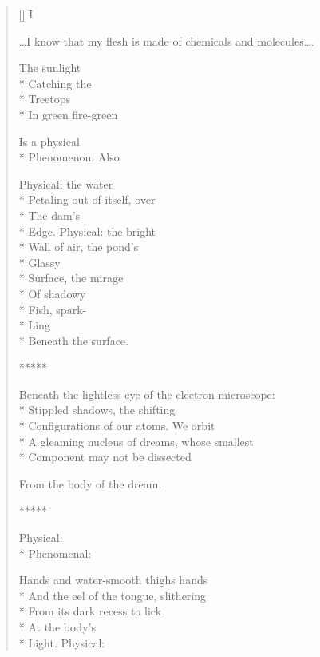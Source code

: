 \label{ch:the_body_of_the_dream}
\settowidth{\versewidth}{     \ldots . I know that my flesh is made of chemicals and molecules. I know that what I'm seeing is like a dream. I know that consciousness is something totally different but yet in some powerful way connected to this physical/chemical organization\ldots .}
\begin{verse}[\versewidth]
                                        I

     \ldots I know that my flesh is made of chemicals and molecules\ldots .

The sunlight\\*
Catching the\\*
Treetops\\*
In green fire-green

Is a physical\\*
Phenomenon.     Also

Physical:     the water\\*
Petaling out of itself, over\\*
The dam's\\*
Edge.      Physical:      the bright\\*
Wall of air, the pond's\\*
Glassy\\*
Surface,    the mirage\\*
Of shadowy\\*
Fish, spark-\\*
Ling\\*
Beneath the surface.

      *****

Beneath the lightless eye of the electron microscope:\\*
Stippled shadows, the shifting\\*
Configurations of our atoms.   We orbit\\*
A gleaming nucleus of dreams, whose smallest\\*
Component may not be dissected

From the body of the dream.

      *****

Physical:\\*
Phenomenal:

Hands and water-smooth thighs       hands\\*
And the eel of the tongue, slithering\\*
From its dark recess to lick\\*
At the body's\\*
Light.     Physical:


\end{verse}
